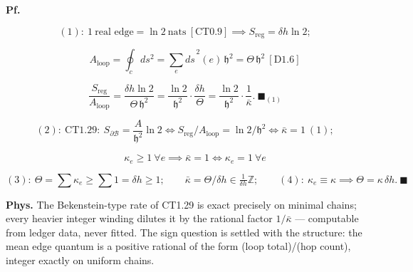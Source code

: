 \begin{theorem}
\textbf{Pf.}

\[
(1):\ 1\ \text{real edge}=\ln2\ \text{nats}\ [\mathrm{CT0.9}]\implies S_{\mathrm{reg}}=\delta h\ln2;
\]

\[
\qquad A_{\mathrm{loop}}=\oint_c ds^2=\sum_e\widehat{ds}^{\,2}(e)\,\mathfrak h^2=\Theta\,\mathfrak h^2\ [\mathrm{D1.6}]
\]

\[
\frac{S_{\mathrm{reg}}}{A_{\mathrm{loop}}}=\frac{\delta h\ln2}{\Theta\,\mathfrak h^2}=\frac{\ln2}{\mathfrak h^2}\cdot\frac{\delta h}{\Theta}=\frac{\ln2}{\mathfrak h^2}\cdot\frac1{\bar\kappa}.\ \blacksquare_{(1)}
\]

\[
(2):\ \text{CT1.29}:\ S_{\partial\mathcal B}=\frac{A}{\mathfrak h^2}\ln2\iff S_{\mathrm{reg}}/A_{\mathrm{loop}}=\ln2/\mathfrak h^2\iff\bar\kappa=1\ (1);
\]

\[
\qquad \kappa_e\ge1\ \forall e\implies\bar\kappa=1\iff\kappa_e=1\ \forall e
\]

\[
(3):\ \Theta=\sum\kappa_e\ge\sum1=\delta h\ge1;\qquad \bar\kappa=\Theta/\delta h\in\tfrac1{\delta h}\mathbb Z;\qquad(4):\ \kappa_e\equiv\kappa\implies\Theta=\kappa\,\delta h.\ \blacksquare
\]

\textbf{Phys.} The Bekenstein-type rate of CT1.29 is exact precisely on minimal chains; every heavier integer winding dilutes it by the rational factor $1/\bar\kappa$ — computable from ledger data, never fitted. The sign question is settled with the structure: the mean edge quantum is a positive rational of the form (loop total)/(hop count), integer exactly on uniform chains.

\end{theorem}

